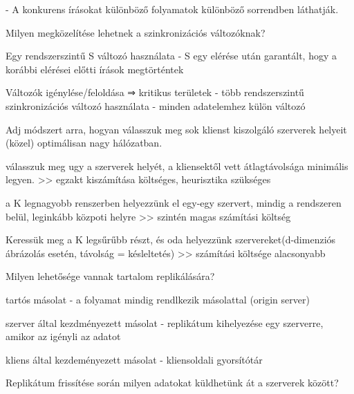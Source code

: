 \documentclass[twoside, a4paper, 12pt]{article}
\begin{document}
\begin{description}
                                        - A konkurens írásokat különböző folyamatok különböző sorrendben láthatják.
                                    \item  Milyen megközelítése lehetnek a szinkronizációs változóknak?
                                    \item Egy rendszerszintű S változó használata
                                        - S egy elérése után garantált, hogy a korábbi elérései előtti írások megtörténtek
                                    \item Változók  igénylése/feloldása ⇒ kritikus területek
                                        - több rendszerszintű szinkronizációs változó használata
                                        - minden adatelemhez külön változó
                                    \item  Adj módszert arra, hogyan válasszuk meg sok klienst kiszolgáló szerverek helyeit (közel) optimálisan nagy hálózatban.
                                    \item válasszuk meg ugy a szerverek helyét, a kliensektől vett átlagtávolsága minimális legyen.
                                        >> egzakt kiszámítása költséges, heurisztika szükséges
                                    \item a K legnagyobb renszerben helyezzünk el egy-egy szervert, mindig a rendszeren belül, leginkább közpoti helyre
                                        >>  szintén magas számítási költség
                                    \item Keressük meg a K legsűrűbb részt, és oda helyezzünk szervereket(d-dimenziós ábrázolás esetén, távolság = késleltetés)
                                        >> számítási költsége alacsonyabb	
                                    \item  Milyen lehetősége vannak tartalom replikálására?
                                    \item tartós másolat
                                        - a folyamat mindig rendlkezik másolattal (origin server)
                                    \item szerver által kezdményezett másolat
                                        - replikátum kihelyezése egy szerverre, amikor az igényli az adatot
                                    \item kliens által kezdeményezett másolat
                                        - kliensoldali gyorsítótár
                                    \item  Replikátum frissítése során milyen adatokat küldhetünk át a szerverek között?

\end{description}
\end{document}
